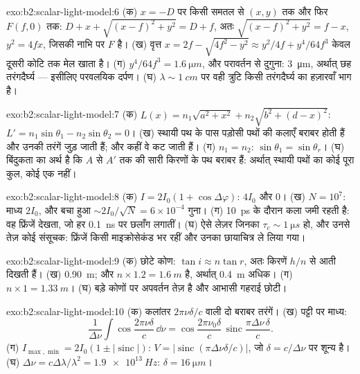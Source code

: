 \begin{solution}{exo:b2:scalar-light-model:6}
(क) $x = -D$ पर किसी समतल  से $(x, y)$ तक और फिर $F(f, 0)$ तक: $D + x
+ \sqrt{(x - f)^2 + y^2} = D + f$, अतः $\sqrt{(x - f)^2 + y^2} = f - x$, $y^2 = 4fx$,
जिसकी नाभि पर $F$ है। (ख) वृत्त $x = 2f - \sqrt{4f^2 - y^2} \approx y^2/4f +
y^4/64f^3$ केवल दूसरी कोटि तक मेल खाता है। (ग) $y^4/64f^3 = \qty{1.6}{\micro m}$, और परावर्तन से
दुगुना: \qty{3}{\micro m}, अर्थात् छह तरंगदैर्घ्य --- इसीलिए परवलयिक
दर्पण। (घ) $\lambda \sim \qty{1}{cm}$ पर वही त्रुटि किसी तरंगदैर्घ्य का
हज़ारवाँ भाग है।
\end{solution}

\begin{solution}{exo:b2:scalar-light-model:7}
(क) $L(x) = n_1\sqrt{a^2 + x^2} + n_2\sqrt{b^2 + (d - x)^2}$: $L' = n_1\sin\theta_1 -
n_2\sin\theta_2 = 0$। (ख) स्थायी पथ के पास पड़ोसी पथों की कलाएँ
बराबर होती हैं और उनकी तरंगें जुड़ जाती हैं; और कहीं वे कट जाती हैं। (ग) $n_1 = n_2$:
$\sin\theta_1 = \sin\theta_r$। (घ) बिंदुकता का अर्थ है कि $A$ से $A'$ तक की सारी किरणों के
पथ बराबर हैं: अर्थात् स्थायी पथों का कोई पूरा कुल, कोई एक नहीं।
\end{solution}

\begin{solution}{exo:b2:scalar-light-model:8}
(क) $I = 2I_0(1 + \cos\Delta\varphi)$: $4I_0$ और $0$। (ख) $N = 10^7$: माध्य $2I_0$, और बचा हुआ
$\sim 2I_0/\sqrt N = 6 \times 10^{-4}$ गुना। (ग) \qty{10}{ps} के दौरान कला
जमी रहती है: वह फ्रिंजें देखता, जो हर \qty{0.1}{ns} पर छलाँग लगातीं। (घ) ऐसे लेज़र जिनका
$\tau_c \sim \qty{1}{\micro s}$ हो, और उनसे तेज़ कोई संसूचक: फ्रिंजें किसी
माइक्रोसेकंड भर रहीं और उनका छायाचित्र ले लिया गया।
\end{solution}

\begin{solution}{exo:b2:scalar-light-model:9}
(क) छोटे कोण: $\tan i \approx n\tan r$, अतः किरणें $h/n$ से आती दिखती हैं।
(ख) \qty{0.90}{m}; और  $n \times 1.2 = \qty{1.6}{m}$ है, अर्थात् \qty{0.4}{m} अधिक।
(ग) $n \times 1 = \qty{1.33}{m}$। (घ) बड़े कोणों पर अपवर्तन तेज़ है
और आभासी गहराई छोटी।
\end{solution}

\begin{solution}{exo:b2:scalar-light-model:10}
(क) कलांतर $2\pi\nu\delta/c$ वाली दो बराबर तरंगें। (ख) पट्टी पर
माध्य:
\[
\frac1{\Delta\nu}\int\cos\frac{2\pi\nu\delta}c\,\dd\nu = \cos\frac{2\pi\nu_0\delta}c\,\operatorname{sinc}\frac{\pi\Delta\nu\,\delta}c .
\]
(ग)
$I_{\max, \min} = 2I_0(1 \pm |\operatorname{sinc}|)$: $V = |\operatorname{sinc}(\pi\Delta\nu\delta/c)|$,
जो $\delta = c/\Delta\nu$ पर शून्य है। (घ) $\Delta\nu = c\Delta\lambda/\lambda^2 = \qty{1.9e13}{Hz}$: $\delta =
\qty{16}{\micro m}$।
\end{solution}

